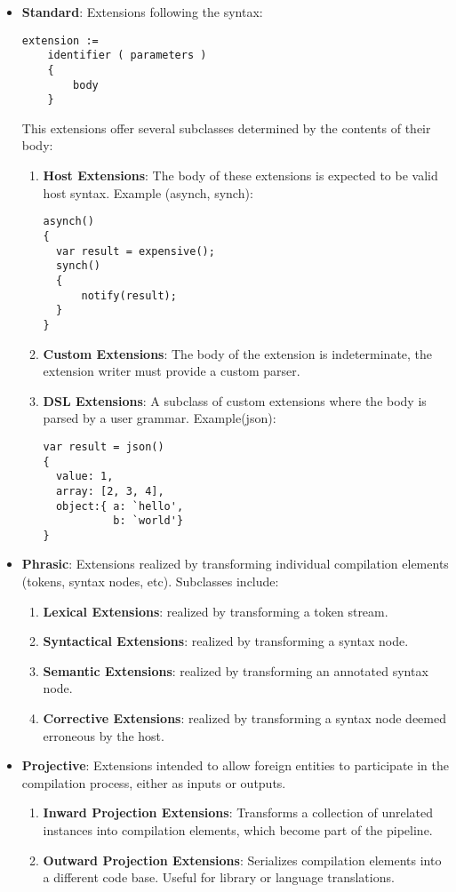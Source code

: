 \documentclass[conference]{IEEEtran}
\begin{document}
\begin{itemize}
    \item \textbf{Standard}:  Extensions following the syntax:
    \begin{lstlisting}
extension := 
    identifier ( parameters )  
    {  
        body  
    }
    \end{lstlisting}

    This extensions offer several subclasses determined by the contents of their body:	

    \begin{enumerate}
    	\item \textbf{Host Extensions}: The body of these extensions is expected to be valid host syntax. Example (asynch, synch):
    	\begin{lstlisting}
asynch()
{
  var result = expensive();
  synch()
  {
      notify(result);
  }
}
    	\end{lstlisting}

    	\item \textbf{Custom  Extensions}: The body of the extension is indeterminate, the extension writer must provide a custom parser.
    	\item \textbf{DSL Extensions}: A subclass of custom extensions where the body is parsed by a user grammar. Example(json):
    	\begin{lstlisting}
var result = json()
{
  value: 1,
  array: [2, 3, 4],
  object:{ a: `hello', 
           b: `world'}
}
	\end{lstlisting}
    \end{enumerate}

    \item \textbf{Phrasic}: Extensions realized by transforming individual compilation elements (tokens, syntax nodes, etc). Subclasses include:
    \begin{enumerate}
    	\item \textbf{Lexical Extensions}: realized by transforming a token stream.
    	\item \textbf{Syntactical Extensions}: realized by transforming a syntax node. 
    	\item\textbf{ Semantic Extensions}: realized by transforming an annotated syntax node. 
    	\item \textbf{Corrective Extensions}: realized by transforming a syntax node deemed erroneous by the host. 
    \end{enumerate}

    \item \textbf{Projective}: Extensions intended to allow foreign entities to participate in the compilation process, either as inputs or outputs.
    \begin{enumerate}
    	\item \textbf{Inward Projection Extensions}: Transforms a collection of unrelated instances into compilation elements, which become part of the pipeline.
    	\item \textbf{Outward Projection Extensions}: Serializes compilation elements into a different code base. Useful for library or language translations. 
    \end{enumerate}


\end{itemize}
\end{document}
